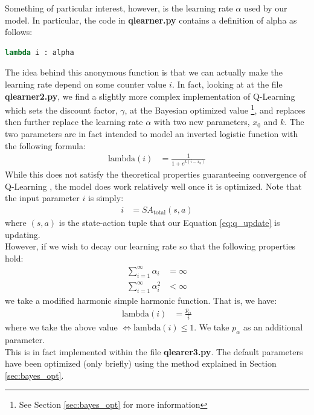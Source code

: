 \documentclass[letterpaper]{article}
\begin{document}
Something of particular interest, however, is the learning rate $\alpha$ used by our model. In particular, the code in \textbf{qlearner.py} contains a definition of alpha as follows:
\begin{lstlisting}[language=Python]
lambda i : alpha
\end{lstlisting}
The idea behind this anonymous function is that we can actually make the learning rate depend on some counter value $i$. In fact, looking at at the file \textbf{qlearner2.py}, we find a slightly more complex implementation of Q-Learning which sets the discount factor, $\gamma$, at the Bayesian optimized value \footnote{See Section \ref{sec:bayes_opt} for more information}, and replaces then further replace the learning rate $\alpha$ with two new parameters, $x_0$ and $k$. The two parameters are in fact intended to model an inverted logistic function with the following formula:
\begin{align}
\text{lambda}(i) &= \frac{1}{1 + e^{k(i-x_0)}}
\end{align}
While this does not satisfy the theoretical properties guaranteeing convergence of Q-Learning \cite{rl_lecture}, the model does work relatively well once it is optimized. Note that the input parameter $i$ is simply:
\begin{align*}
i &= SA_{\text{total}}(s,a)
\end{align*}
where $(s,a)$ is the state-action tuple that our Equation \ref{eq:q_update} is updating.\\

However, if we wish to decay our learning rate so that the following properties hold:
\begin{align}
\sum_{i=1}^{\infty} \alpha_i &= \infty \\
\sum_{i=1}^{\infty} \alpha_i^2 &< \infty
\end{align}
we take a modified harmonic simple harmonic function. That is, we have:
\begin{align}
\text{lambda}(i) &= \frac{p_{\alpha}}{i} \label{eq:harmonic}
\end{align}
where we take the above value $\iff \text{lambda}(i) \leq 1$. We take $p_{\alpha}$ as an additional parameter. \\

This is in fact implemented within the file \textbf{qlearer3.py}. The default parameters have been optimized (only briefly) using the method explained in Section \ref{sec:bayes_opt}.\\
\end{document}

